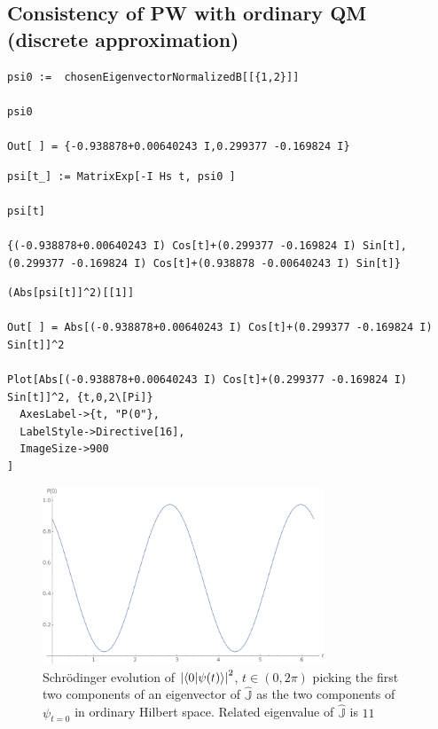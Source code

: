 \subsection{Consistency of PW with ordinary QM (discrete approximation)}

\begin{Verbatim}
psi0 :=  chosenEigenvectorNormalizedB[[{1,2}]]

psi0

Out[ ] = {-0.938878+0.00640243 I,0.299377 -0.169824 I}
\end{Verbatim}

\begin{Verbatim}
psi[t_] := MatrixExp[-I Hs t, psi0 ]

psi[t]

{(-0.938878+0.00640243 I) Cos[t]+(0.299377 -0.169824 I) Sin[t],(0.299377 -0.169824 I) Cos[t]+(0.938878 -0.00640243 I) Sin[t]}
\end{Verbatim}

\begin{Verbatim}
(Abs[psi[t]]^2)[[1]]

Out[ ] = Abs[(-0.938878+0.00640243 I) Cos[t]+(0.299377 -0.169824 I) Sin[t]]^2

Plot[Abs[(-0.938878+0.00640243 I) Cos[t]+(0.299377 -0.169824 I) Sin[t]]^2, {t,0,2\[Pi]}
  AxesLabel->{t, "P(0"},
  LabelStyle->Directive[16],
  ImageSize->900
]
\end{Verbatim}
\begin{figure}[!h]
  \centering
  \includegraphics[width=0.75\textwidth]{img/probB_0.png}
  \caption[(from notebook)]{
    Schr{\"o}dinger evolution of
    $\qty|\braket{0}{\psi(t)}|^2$, $t \in (0, 2\pi) $
    picking the first two components of an eigenvector of $\hat{\mathbb{J}}$
    as the two components of $\psi_{t=0}$ in ordinary Hilbert space.
    Related eigenvalue of $\hat{\mathbb{J}}$ is $11$
  }
\end{figure}

